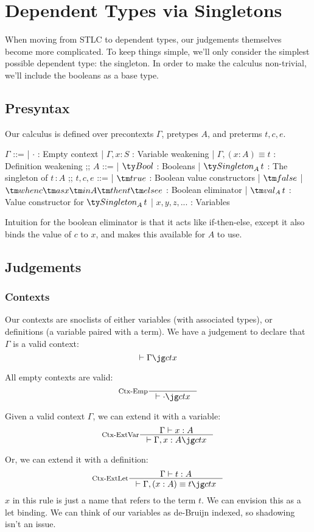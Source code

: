 \section{Dependent Types via Singletons}
When moving from STLC to dependent types, our judgements themselves become more complicated.
To keep things simple, we'll only consider the simplest possible dependent type: the singleton.
In order to make the calculus non-trivial, we'll include the booleans as a base type.

\subsection{Presyntax}
Our calculus is defined over precontexts $\Gamma$, pretypes $A$, and preterms $t, c, e$.

\begin{bnf}
$\Gamma$ ::=
  | $\cdot$ : Empty context
  | $\Gamma, x \colon S$ : Variable weakening
  | $\Gamma, (x \colon A) \equiv t$ : Definition weakening
;;
$A$ ::=
  | $\Bool$ : Booleans
  | $\Singleton[A][t]$ : The singleton of $t \,\colon A$
;;
$t, c, e$ ::=
| $\true$ : Boolean value constructors
| $\false$
| $\when{c}{x}{A}{t}{e}$ : Boolean eliminator
| $\val[A][t]$ : Value constructor for $\Singleton[A][t]$
| $x, y, z, ...$ : Variables
\end{bnf}

Intuition for the boolean eliminator is that it acts like if-then-else, except it also binds the value of $c$ to $x$, and makes this available for $A$ to use.

\subsection{Judgements}
\subsubsection{Contexts}
Our contexts are snoclists of either variables (with associated types), or definitions (a variable paired with a term).
We have a judgement to declare that $\Gamma$ is a valid context:
\[
  \vdash \ctx{\Gamma}
\]

All empty contexts are valid:
\[
  \inference[Ctx-Emp]{}{\vdash \ctx{\cdot}}
\]

Given a valid context $\Gamma$, we can extend it with a variable:
\[
  \inference[Ctx-ExtVar]
  {\Gamma \vdash x : A}
  {\vdash \ctx{\Gamma, x : A}}
\]

Or, we can extend it with a definition:
\[
  \inference[Ctx-ExtLet]
  {\Gamma \vdash t : A}
  {\vdash \ctx{\Gamma, (x : A) \equiv t}}
\]
$x$ in this rule is just a name that refers to the term $t$.
We can envision this as a let binding.
We can think of our variables as de-Bruijn indexed, so shadowing isn't an issue.


